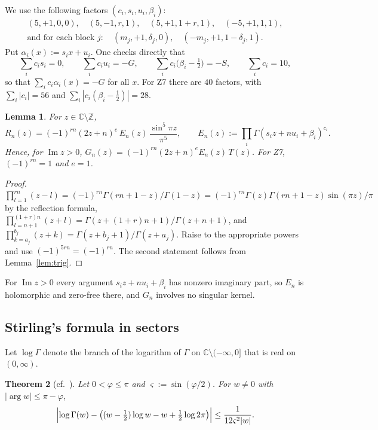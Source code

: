 \documentclass[11pt]{amsart}
\newtheorem{theorem}{Theorem}[section]
\newtheorem{lemma}[theorem]{Lemma}
\theoremstyle{definition}
\theoremstyle{remark}
\numberwithin{equation}{section}
\newcommand{\ZZ}{\mathbb{Z}}
\newcommand{\CC}{\mathbb{C}}
\renewcommand{\Im}{\operatorname{Im}}
\begin{document}
We use the following factors $(c_i,s_i,u_i,\beta_i)$:
\begin{gather*}
  (5,+1,0,0),\quad(5,-1,r,1),\quad(5,+1,1+r,1),\quad(-5,+1,1,1),\\
  \text{and for each block } j:\quad(m_j,+1,\delta_j,0),\quad(-m_j,+1,1-\delta_j,1).
\end{gather*}
Put $\alpha_i(x):=s_ix+u_i$. One checks directly that
\begin{equation}\label{eq:factorid}
  \sum_ic_is_i=0,\qquad\sum_ic_iu_i=-G,\qquad\sum_ic_i\bigl(\beta_i-\tfrac12\bigr)=-S,\qquad\sum_ic_i=10,
\end{equation}
so that $\sum_ic_i\alpha_i(x)=-G$ for all $x$. For Z7 there are $40$ factors, with $\sum_i|c_i|=56$ and
$\sum_i|c_i(\beta_i-\frac12)|=28$.

\begin{lemma}\label{lem:gamma}
For $z\in\CC\setminus\ZZ$,
\[
  R_n(z)=(-1)^{rn}(2z+n)^e\,E_n(z)\,\frac{\sin^5\pi z}{\pi^5},\qquad
  E_n(z):=\prod_i\Gamma(s_iz+nu_i+\beta_i)^{c_i}.
\]
Hence, for $\Im z>0$, $G_n(z)=(-1)^{rn}(2z+n)^eE_n(z)\,T(z)$. For Z7, $(-1)^{rn}=1$ and $e=1$.
\end{lemma}

\begin{proof}
$\prod_{l=1}^{rn}(z-l)=(-1)^{rn}\Gamma(rn+1-z)/\Gamma(1-z)=(-1)^{rn}\Gamma(z)\Gamma(rn+1-z)\sin(\pi z)/\pi$ by the
reflection formula, $\prod_{l=n+1}^{(1+r)n}(z+l)=\Gamma(z+(1+r)n+1)/\Gamma(z+n+1)$, and
$\prod_{k=a_j}^{b_j}(z+k)=\Gamma(z+b_j+1)/\Gamma(z+a_j)$. Raise to the appropriate powers and use
$(-1)^{5rn}=(-1)^{rn}$. The second statement follows from Lemma~\ref{lem:trig}.
\end{proof}

For $\Im z>0$ every argument $s_iz+nu_i+\beta_i$ has nonzero imaginary part, so $E_n$ is holomorphic and zero-free
there, and $G_n$ involves no singular kernel.

\subsection{Stirling's formula in sectors}

Let $\log\Gamma$ denote the branch of the logarithm of $\Gamma$ on $\CC\setminus(-\infty,0]$ that is real on
$(0,\infty)$.

\begin{theorem}[{cf.~\cite[\S5.11(ii)]{DLMF}}]\label{thm:stirling}
Let $0<\varphi\le\pi$ and $\varsigma:=\sin(\varphi/2)$. For $w\ne0$ with $|\arg w|\le\pi-\varphi$,
\[
  \Bigl|\log\Gamma(w)-\bigl((w-\tfrac12)\log w-w+\tfrac12\log2\pi\bigr)\Bigr|\le\frac1{12\varsigma^2|w|}.
\]
\end{theorem}
\end{document}
